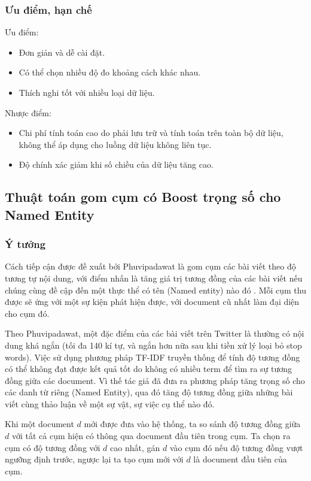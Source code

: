 	\subsubsection{Ưu điểm, hạn chế}
		Ưu điểm:
		\begin{itemize}
			\item Đơn giản và dễ cài đặt.
			\item Có thể chọn nhiều độ đo khoảng cách khác nhau.
			\item Thích nghi tốt với nhiều loại dữ liệu.
		\end{itemize}
		Nhược điểm:
		\begin{itemize}
			\item Chi phí tính toán cao do phải lưu trữ và tính toán trên toàn bộ dữ liệu, không thể áp dụng cho luồng dữ liệu không liên tục.
			\item Độ chính xác giảm khi số chiều của dữ liệu tăng cao.
		\end{itemize}
	
\subsection{Thuật toán gom cụm có Boost trọng số cho Named Entity}
	\subsubsection{Ý tưởng}
	Cách tiếp cận được đề xuất bởi Phuvipadawat là gom cụm các bài viết theo độ tương tự nội dung, với điểm nhấn là tăng giá trị tương đồng của các bài viết nếu chúng cùng đề cập đến một thực thể có tên (Named entity) nào đó \cite{SwitPhuvipadawat}. Mỗi cụm thu được sẽ ứng với một sự kiện phát hiện được, với document cũ nhất làm đại diện cho cụm đó.
	
	Theo Phuvipadawat, một đặc điểm của các bài viết trên Twitter là thường có nội dung khá ngắn (tối đa 140 kí tự, và ngắn hơn nữa sau khi tiền xử lý loại bỏ stop words). Việc sử dụng phương pháp TF-IDF truyền thống để tính độ tương đồng có thể không đạt được kết quả tốt do không có nhiều term để tìm ra sự tương đồng giữa các document. Vì thế tác giả đã đưa ra phương pháp tăng trọng số cho các danh từ riêng (Named Entity), qua đó tăng độ tương đồng giữa những bài viết cùng thảo luận về một sự vật, sự việc cụ thể nào đó.
		
	Khi một document $d$ mới được đưa vào hệ thống, ta so sánh độ tương đồng giữa $d$ với tất cả cụm hiện có thông qua document đầu tiên trong cụm. Ta chọn ra cụm có độ tương đồng với $d$ cao nhất, gán $d$ vào cụm đó nếu độ tương đồng vượt ngưỡng định trước, ngược lại ta tạo cụm mới với $d$ là document đầu tiên của cụm.
	
